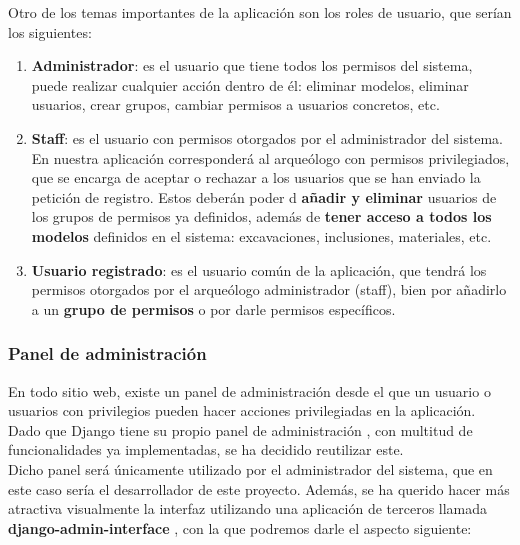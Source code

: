 Otro de los temas importantes de la aplicación son los roles de usuario, que serían los
siguientes:

    \begin{enumerate}
        \item \textbf{Administrador}: es el usuario que tiene todos los permisos del
        sistema, puede realizar cualquier acción dentro de él: eliminar modelos, eliminar
        usuarios, crear grupos, cambiar permisos a usuarios concretos, etc.
        \item \textbf{Staff}: es el usuario con permisos otorgados por el administrador
        del sistema. En nuestra aplicación corresponderá al arqueólogo con permisos
        privilegiados, que se encarga de aceptar o rechazar a los usuarios que se han
        enviado la petición de registro. Estos deberán poder d \textbf{añadir y eliminar}
        usuarios de los grupos de permisos ya definidos, además de \textbf{tener acceso a
        todos los modelos} definidos en el sistema: excavaciones, inclusiones, materiales, etc.
        \item \textbf{Usuario registrado}: es el usuario común de la aplicación, que tendrá
        los permisos otorgados por el arqueólogo administrador (staff), bien por añadirlo
        a un \textbf{grupo de permisos} o por darle permisos específicos.
    \end{enumerate}

\subsubsection{Panel de administración}
En todo sitio web, existe un panel de administración desde el que un usuario o usuarios
con privilegios pueden hacer acciones privilegiadas en la aplicación. Dado que Django
tiene su propio panel de administración \cite{admin-panel}, con multitud de funcionalidades
ya implementadas, se ha decidido reutilizar este.\\

Dicho panel será únicamente utilizado por el administrador del sistema, que en este caso
sería el desarrollador de este proyecto. Además, se ha querido hacer más atractiva
visualmente la interfaz utilizando una aplicación de terceros llamada
\textbf{django-admin-interface} \cite{admin-interface}, con la que podremos darle el
aspecto siguiente:

